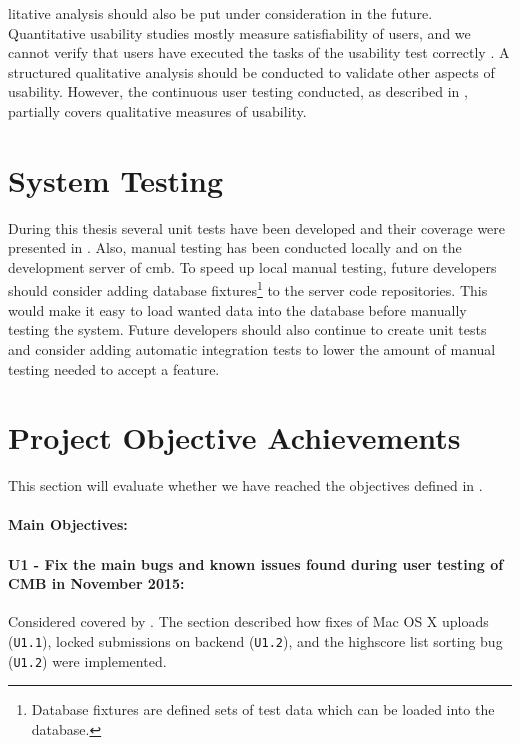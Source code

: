 litative analysis should also be put under consideration in the future. Quantitative usability studies mostly measure satisfiability of users, and we cannot verify that users have executed the tasks of the usability test correctly \cite{holzinger2005}. A structured qualitative analysis should be conducted to validate other aspects of usability. However, the continuous user testing conducted, as described in , partially covers qualitative measures of usability.

\section{System Testing}
\label{sec:eval-sys-testing}
During this thesis several unit tests have been developed and their coverage were presented in . Also, manual testing has been conducted locally and on the development server of \gls{cmb}. To speed up local manual testing, future developers should consider adding database fixtures\footnote{Database fixtures are defined sets of test data which can be loaded into the database.} to the server code repositories. This would make it easy to load wanted data into the database before manually testing the system. Future developers should also continue to create unit tests and consider adding automatic integration tests to lower the amount of manual testing needed to accept a feature.

\section{Project Objective Achievements}
\label{sec:eval-pr-achiev}
This section will evaluate whether we have reached the objectives defined in .

\paragraph*{Main Objectives:} \hfill

\paragraph*{U1 - Fix the main bugs and known issues found during user testing of CMB in November 2015:} Considered covered by . The section described how fixes of Mac OS X uploads (\texttt{U1.1}), locked submissions on backend (\texttt{U1.2}), and the highscore list sorting bug (\texttt{U1.2}) were implemented.

